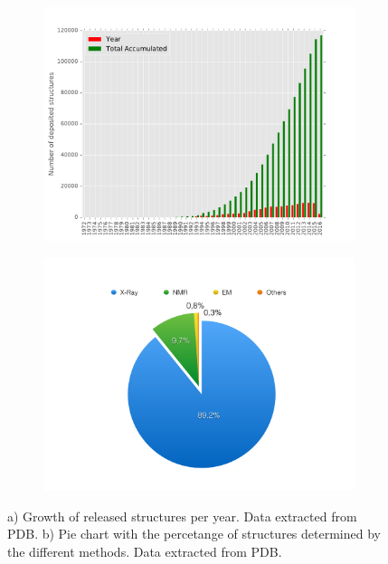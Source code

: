 \documentclass[12pt, b5paper,twoside]{tesi_upf}
\begin{document}
\begin{figure}[htbp]
  
  \centering
    \begin{subfigure}[b]{0.75\textwidth}
	\includegraphics[width=1\linewidth]{../figures/pdbs_per_year.pdf}
	\caption{}
	\label{fig:structures_pdb}
	\end{subfigure}
	\begin{subfigure}[b]{0.55\textwidth}
	\includegraphics[width=1\linewidth]{../figures/pie_smethods.pdf}
	\caption{}
	\label{fig:smethods_pie}
	\end{subfigure}
   \caption[Deposited structures in PDB per year]{a) Growth of released structures per year. Data extracted from PDB. b) Pie chart with the percetange of structures determined by the different methods. Data extracted from PDB.}
   
	
	
\end{figure}
\end{document}
